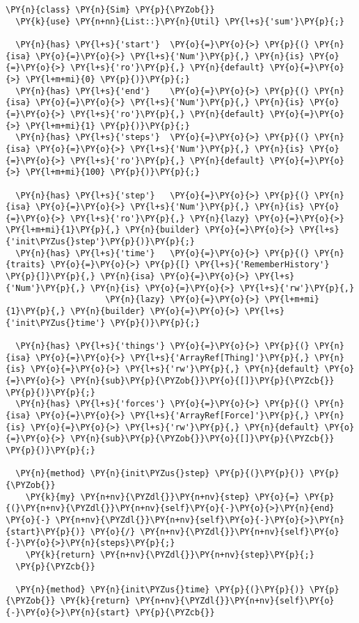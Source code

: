 \begin{Verbatim}[commandchars=\\\{\}]
\PY{n}{class} \PY{n}{Sim} \PY{p}{\PYZob{}}
  \PY{k}{use} \PY{n+nn}{List::}\PY{n}{Util} \PY{l+s}{'sum'}\PY{p}{;}

  \PY{n}{has} \PY{l+s}{'start'}  \PY{o}{=}\PY{o}{>} \PY{p}{(} \PY{n}{isa} \PY{o}{=}\PY{o}{>} \PY{l+s}{'Num'}\PY{p}{,} \PY{n}{is} \PY{o}{=}\PY{o}{>} \PY{l+s}{'ro'}\PY{p}{,} \PY{n}{default} \PY{o}{=}\PY{o}{>} \PY{l+m+mi}{0} \PY{p}{)}\PY{p}{;}
  \PY{n}{has} \PY{l+s}{'end'}    \PY{o}{=}\PY{o}{>} \PY{p}{(} \PY{n}{isa} \PY{o}{=}\PY{o}{>} \PY{l+s}{'Num'}\PY{p}{,} \PY{n}{is} \PY{o}{=}\PY{o}{>} \PY{l+s}{'ro'}\PY{p}{,} \PY{n}{default} \PY{o}{=}\PY{o}{>} \PY{l+m+mi}{1} \PY{p}{)}\PY{p}{;}
  \PY{n}{has} \PY{l+s}{'steps'}  \PY{o}{=}\PY{o}{>} \PY{p}{(} \PY{n}{isa} \PY{o}{=}\PY{o}{>} \PY{l+s}{'Num'}\PY{p}{,} \PY{n}{is} \PY{o}{=}\PY{o}{>} \PY{l+s}{'ro'}\PY{p}{,} \PY{n}{default} \PY{o}{=}\PY{o}{>} \PY{l+m+mi}{100} \PY{p}{)}\PY{p}{;}

  \PY{n}{has} \PY{l+s}{'step'}   \PY{o}{=}\PY{o}{>} \PY{p}{(} \PY{n}{isa} \PY{o}{=}\PY{o}{>} \PY{l+s}{'Num'}\PY{p}{,} \PY{n}{is} \PY{o}{=}\PY{o}{>} \PY{l+s}{'ro'}\PY{p}{,} \PY{n}{lazy} \PY{o}{=}\PY{o}{>} \PY{l+m+mi}{1}\PY{p}{,} \PY{n}{builder} \PY{o}{=}\PY{o}{>} \PY{l+s}{'init\PYZus{}step'}\PY{p}{)}\PY{p}{;}
  \PY{n}{has} \PY{l+s}{'time'}   \PY{o}{=}\PY{o}{>} \PY{p}{(} \PY{n}{traits} \PY{o}{=}\PY{o}{>} \PY{p}{[} \PY{l+s}{'RememberHistory'} \PY{p}{]}\PY{p}{,} \PY{n}{isa} \PY{o}{=}\PY{o}{>} \PY{l+s}{'Num'}\PY{p}{,} \PY{n}{is} \PY{o}{=}\PY{o}{>} \PY{l+s}{'rw'}\PY{p}{,} 
                    \PY{n}{lazy} \PY{o}{=}\PY{o}{>} \PY{l+m+mi}{1}\PY{p}{,} \PY{n}{builder} \PY{o}{=}\PY{o}{>} \PY{l+s}{'init\PYZus{}time'} \PY{p}{)}\PY{p}{;}

  \PY{n}{has} \PY{l+s}{'things'} \PY{o}{=}\PY{o}{>} \PY{p}{(} \PY{n}{isa} \PY{o}{=}\PY{o}{>} \PY{l+s}{'ArrayRef[Thing]'}\PY{p}{,} \PY{n}{is} \PY{o}{=}\PY{o}{>} \PY{l+s}{'rw'}\PY{p}{,} \PY{n}{default} \PY{o}{=}\PY{o}{>} \PY{n}{sub}\PY{p}{\PYZob{}}\PY{o}{[]}\PY{p}{\PYZcb{}} \PY{p}{)}\PY{p}{;}
  \PY{n}{has} \PY{l+s}{'forces'} \PY{o}{=}\PY{o}{>} \PY{p}{(} \PY{n}{isa} \PY{o}{=}\PY{o}{>} \PY{l+s}{'ArrayRef[Force]'}\PY{p}{,} \PY{n}{is} \PY{o}{=}\PY{o}{>} \PY{l+s}{'rw'}\PY{p}{,} \PY{n}{default} \PY{o}{=}\PY{o}{>} \PY{n}{sub}\PY{p}{\PYZob{}}\PY{o}{[]}\PY{p}{\PYZcb{}} \PY{p}{)}\PY{p}{;}

  \PY{n}{method} \PY{n}{init\PYZus{}step} \PY{p}{(}\PY{p}{)} \PY{p}{\PYZob{}}
    \PY{k}{my} \PY{n+nv}{\PYZdl{}}\PY{n+nv}{step} \PY{o}{=} \PY{p}{(}\PY{n+nv}{\PYZdl{}}\PY{n+nv}{self}\PY{o}{-}\PY{o}{>}\PY{n}{end} \PY{o}{-} \PY{n+nv}{\PYZdl{}}\PY{n+nv}{self}\PY{o}{-}\PY{o}{>}\PY{n}{start}\PY{p}{)} \PY{o}{/} \PY{n+nv}{\PYZdl{}}\PY{n+nv}{self}\PY{o}{-}\PY{o}{>}\PY{n}{steps}\PY{p}{;}
    \PY{k}{return} \PY{n+nv}{\PYZdl{}}\PY{n+nv}{step}\PY{p}{;}
  \PY{p}{\PYZcb{}}

  \PY{n}{method} \PY{n}{init\PYZus{}time} \PY{p}{(}\PY{p}{)} \PY{p}{\PYZob{}} \PY{k}{return} \PY{n+nv}{\PYZdl{}}\PY{n+nv}{self}\PY{o}{-}\PY{o}{>}\PY{n}{start} \PY{p}{\PYZcb{}}
\end{Verbatim}
